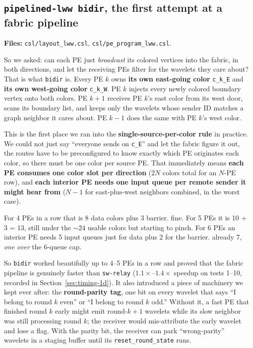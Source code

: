 \documentclass[11pt]{article}
\newcommand{\code}[1]{\texttt{#1}}
\newcommand{\file}[1]{\texttt{#1}}
\begin{document}
\subsection{\code{pipelined-lww bidir}, the first attempt at a fabric pipeline}
\textbf{Files:} \file{csl/layout\_lww.csl},
\file{csl/pe\_program\_lww.csl}.

So we asked: can each PE just \emph{broadcast} its colored
vertices into the fabric, in both directions, and let the
receiving PEs filter for the wavelets they care about? That is
what \code{bidir} is. Every PE $k$ owns \textbf{its own
east-going color} \code{c\_k\_E} and \textbf{its own west-going
color} \code{c\_k\_W}. PE $k$ injects every newly colored
boundary vertex onto both colors. PE $k{+}1$ receives PE $k$'s
east color from its west door, scans its boundary list, and
keeps only the wavelets whose sender ID matches a graph neighbor
it cares about. PE $k{-}1$ does the same with PE $k$'s west
color.

This is the first place we ran into the
\textbf{single-source-per-color rule} in practice. We could not
just say ``everyone sends on \code{c\_E}'' and let the fabric
figure it out, the routes have to be preconfigured to know
exactly which PE originates each color, so there must be one
color per source PE. That immediately means \textbf{each PE
consumes one color slot per direction} ($2N$ colors total for an
$N$-PE row), and \textbf{each interior PE needs one input queue
per remote sender it might hear from} ($N{-}1$ for east-plus-west
neighbors combined, in the worst case).

For 4 PEs in a row that is 8 data colors plus 3 barrier.
fine. For 5 PEs it is 10 + 3 = 13, still under the $\sim\!24$
usable colors but starting to pinch. For 6 PEs an interior PE
needs 5 input queues just for data plus 2 for the barrier.
already 7, \emph{one over} the 6-queue cap.

So \code{bidir} worked beautifully up to 4--5 PEs in a row and
proved that the fabric pipeline is genuinely faster than
\code{sw-relay} ($1.1\times$--$1.4\times$ speedup on tests
1--10, recorded in Section~\ref{sec:timing-1d}). It also
introduced a piece of machinery we kept ever after: the
\textbf{round-parity tag}, one bit on every wavelet that says ``I
belong to round $k$ even'' or ``I belong to round $k$ odd.''
Without it, a fast PE that finished round $k$ early might emit
round-$k{+}1$ wavelets while its slow neighbor was still
processing round $k$; the receiver would mis-attribute the early
wavelet and lose a flag. With the parity bit, the receiver can
park ``wrong-parity'' wavelets in a staging buffer until its
\code{reset\_round\_state} runs.
\end{document}
